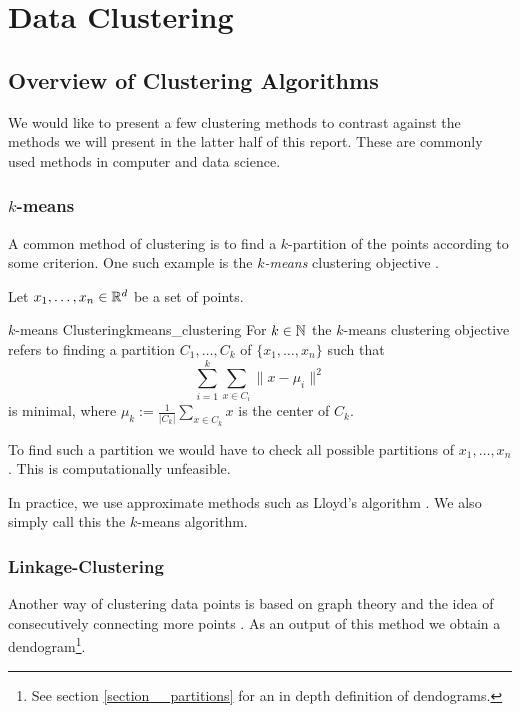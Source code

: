 \chapter{Data Clustering}

\section{Overview of Clustering Algorithms}
We would like to present a few clustering methods to contrast against the methods we will present in the latter half of this report. These are commonly used methods in computer and data science.

\subsection{$k$-means}
A common method of clustering is to find a $k$-partition of the points according to some criterion.
One such example is the \emph{$k$-means} clustering objective \cite[Section~3.1]{Scitovski2021}.

Let $x_1, \dots, x_n \in \mathbb R^d$ be a set of points.

\begin{definition}{$k$-means Clustering}{kmeans_clustering}
For $k \in \mathbb N$ the $k$-means clustering objective refers to finding a partition $C_1, \dots, C_k$ of $\{x_1, \dots, x_n\}$ such that
\begin{equation*}
\label{eq:kmean_optimization}
    \sum_{i = 1}^k \sum_{x \in C_i} \|x - \mu_i\|^2
\end{equation*}
is minimal, where $\mu_k := \frac{1}{|C_k|}\sum_{x \in C_k} x$ is the center of $C_k$.
\end{definition}
To find such a partition we would have to check all possible partitions of $x_1, \dots, x_n$. This is computationally unfeasible.

In practice, we use approximate methods such as Lloyd's algorithm \cite[Section~3.1.2]{Scitovski2021}.
We also simply call this the $k$-means algorithm.

\subsection{Linkage-Clustering}
Another way of clustering data points is based on graph theory and the idea of consecutively connecting more points \cite[Section~4.2.2]{Everitt2011}.
As an output of this method we obtain a
dendogram\footnote{See section \ref{section__partitions} for an in depth definition of dendograms.}.

